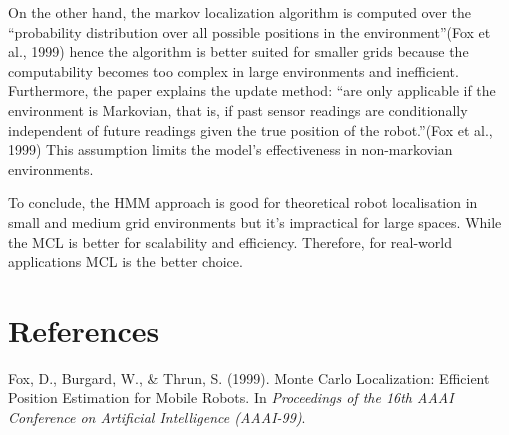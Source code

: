 \documentclass{article}
\begin{document}
On the other hand, the markov localization algorithm is computed over the “probability distribution over all possible positions in the environment”(Fox et al., 1999) hence the algorithm is better suited for smaller grids because the computability becomes too complex in large environments and inefficient.
Furthermore, the paper explains the update method: “are only applicable if the environment is Markovian, that is, if past sensor readings are conditionally independent of future readings given the true position of the robot.”(Fox et al., 1999) This assumption limits the model's effectiveness in non-markovian environments.

To conclude, the HMM approach is good for theoretical robot localisation in small and medium grid environments but it's impractical for large spaces. While the MCL is better for scalability and efficiency. Therefore, for real-world applications MCL is the better choice.

\section*{References}

Fox, D., Burgard, W., \& Thrun, S. (1999). Monte Carlo Localization: Efficient Position Estimation for Mobile Robots. In \textit{Proceedings of the 16th AAAI Conference on Artificial Intelligence (AAAI-99)}.
\end{document}

